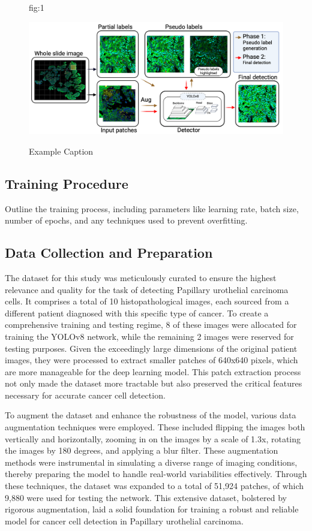 \documentclass[anon]{midl} %
\begin{document}
\begin{figure}[htbp]
\floatconts
  {fig:1}
  {\caption{Example Caption}}
  {\includegraphics[width=0.90\linewidth]{images/1.png}}
\end{figure}


\subsection{Training Procedure}
Outline the training process, including parameters like learning rate, batch size, number of epochs, and any techniques used to prevent overfitting.


\subsection{Data Collection and Preparation}
The dataset for this study was meticulously curated to ensure the highest relevance and quality for the task of detecting Papillary urothelial carcinoma cells. It comprises a total of 10 histopathological images, each sourced from a different patient diagnosed with this specific type of cancer. To create a comprehensive training and testing regime, 8 of these images were allocated for training the YOLOv8 network, while the remaining 2 images were reserved for testing purposes. Given the exceedingly large dimensions of the original patient images, they were processed to extract smaller patches of 640x640 pixels, which are more manageable for the deep learning model. This patch extraction process not only made the dataset more tractable but also preserved the critical features necessary for accurate cancer cell detection.

To augment the dataset and enhance the robustness of the model, various data augmentation techniques were employed. These included flipping the images both vertically and horizontally, zooming in on the images by a scale of 1.3x, rotating the images by 180 degrees, and applying a blur filter. These augmentation methods were instrumental in simulating a diverse range of imaging conditions, thereby preparing the model to handle real-world variabilities effectively. Through these techniques, the dataset was expanded to a total of 51,924 patches, of which 9,880 were used for testing the network. This extensive dataset, bolstered by rigorous augmentation, laid a solid foundation for training a robust and reliable model for cancer cell detection in Papillary urothelial carcinoma.
\end{document}
